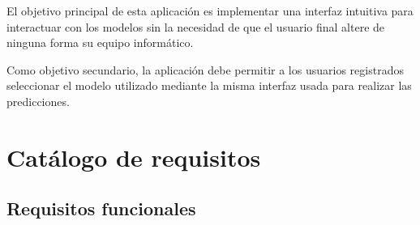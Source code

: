 El objetivo principal de esta aplicación es implementar una interfaz intuitiva
para interactuar con los modelos sin la necesidad de que el usuario final altere
de ninguna forma su equipo informático.

Como objetivo secundario, la aplicación debe permitir a los usuarios registrados
seleccionar el modelo utilizado mediante la misma interfaz usada para realizar
las predicciones.

\section{Catálogo de requisitos}

\subsection{Requisitos funcionales}

